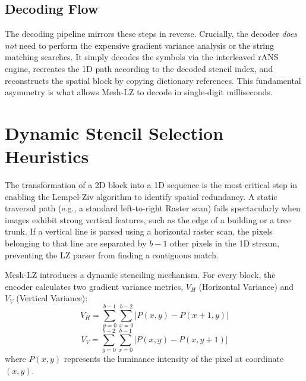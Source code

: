 \subsection{Decoding Flow}
The decoding pipeline mirrors these steps in reverse. Crucially, the decoder \textit{does not} need to perform the expensive gradient variance analysis or the string matching searches. It simply decodes the symbols via the interleaved rANS engine, recreates the 1D path according to the decoded stencil index, and reconstructs the spatial block by copying dictionary references. This fundamental asymmetry is what allows Mesh-LZ to decode in single-digit milliseconds.

\section{Dynamic Stencil Selection Heuristics}

The transformation of a 2D block into a 1D sequence is the most critical step in enabling the Lempel-Ziv algorithm to identify spatial redundancy. A static traversal path (e.g., a standard left-to-right Raster scan) fails spectacularly when images exhibit strong vertical features, such as the edge of a building or a tree trunk. If a vertical line is parsed using a horizontal raster scan, the pixels belonging to that line are separated by $b-1$ other pixels in the 1D stream, preventing the LZ parser from finding a contiguous match.

Mesh-LZ introduces a dynamic stenciling mechanism. For every block, the encoder calculates two gradient variance metrics, $V_H$ (Horizontal Variance) and $V_V$ (Vertical Variance):
\begin{equation}
    V_H = \sum_{y=0}^{b-1} \sum_{x=0}^{b-2} \big| P(x, y) - P(x+1, y) \big|
\end{equation}
\begin{equation}
    V_V = \sum_{y=0}^{b-2} \sum_{x=0}^{b-1} \big| P(x, y) - P(x, y+1) \big|
\end{equation}
where $P(x,y)$ represents the luminance intensity of the pixel at coordinate $(x,y)$.


